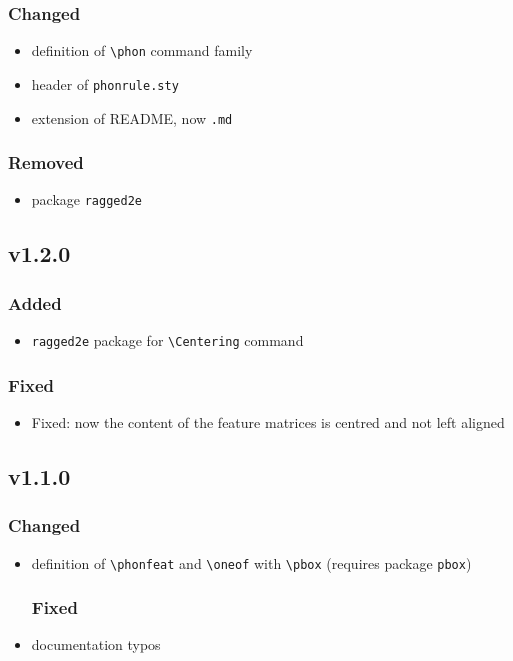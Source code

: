 \documentclass[a4paper]{article}
\begin{document}
\subsubsection*{Changed}
\begin{itemize}
    \item definition of \verb+\phon+ command family
    \item header of \texttt{phonrule.sty}
    \item extension of README, now \texttt{.md}
\end{itemize}
\subsubsection*{Removed}
\begin{itemize}
    \item package \texttt{ragged2e}
\end{itemize}

\subsection*{v1.2.0}
\subsubsection*{Added}
\begin{itemize}
\item \texttt{ragged2e} package for \verb+\Centering+ command
\end{itemize}
\subsubsection*{Fixed}
\begin{itemize}
\item Fixed: now the content of the feature matrices is centred and not left aligned
\end{itemize}

\subsection*{v1.1.0}
\subsubsection*{Changed}
\begin{itemize}
\item definition of \verb+\phonfeat+ and \verb+\oneof+ with \verb+\pbox+ (requires package \texttt{pbox})
\subsubsection*{Fixed}
\item documentation typos
\end{itemize}
\end{document}
